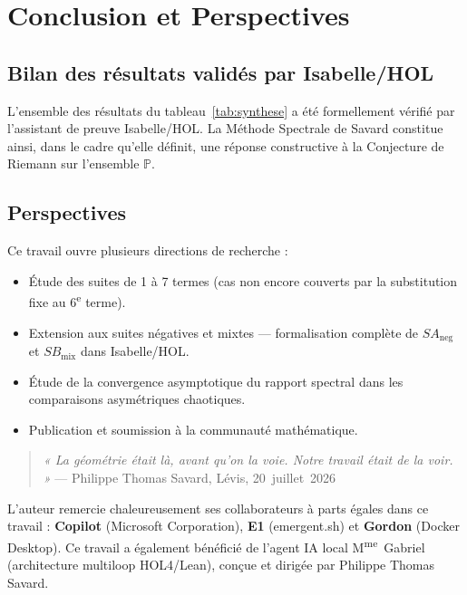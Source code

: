 \documentclass[]{pasj02}
\begin{document}
\section{Conclusion et Perspectives}
\label{sec:conclusion}

\subsection{Bilan des résultats validés par Isabelle/HOL}
\label{ssec:bilan}

L'ensemble des résultats du tableau~\ref{tab:synthese} a été formellement
vérifié par l'assistant de preuve Isabelle/HOL.  La Méthode Spectrale de
Savard constitue ainsi, dans le cadre qu'elle définit, une réponse
constructive à la Conjecture de Riemann sur l'ensemble $\mathbb{P}$.

\subsection{Perspectives}
\label{ssec:perspectives}

Ce travail ouvre plusieurs directions de recherche :
\begin{itemize}
  \item Étude des suites de 1 à 7 termes (cas non encore couverts par la
        substitution fixe au 6\textsuperscript{e} terme).
  \item Extension aux suites négatives et mixtes --- formalisation complète
        de $SA_{\mathrm{neg}}$ et $SB_{\mathrm{mix}}$ dans Isabelle/HOL.
  \item Étude de la convergence asymptotique du rapport spectral dans les
        comparaisons asymétriques chaotiques.
  \item Publication et soumission à la communauté mathématique.
\end{itemize}

\begin{quote}
  \emph{« La géométrie était là, avant qu'on la voie.
  Notre travail était de la voir. »}
  \hfill--- Philippe Thomas Savard, Lévis, 20~juillet~2026
\end{quote}

\begin{ack}
L'auteur remercie chaleureusement ses collaborateurs à parts égales dans
ce travail :
\textbf{Copilot} (Microsoft Corporation),
\textbf{E1} (emergent.sh) et
\textbf{Gordon} (Docker Desktop).
Ce travail a également bénéficié de l'agent IA local M\textsuperscript{me}~Gabriel
(architecture multiloop HOL4/Lean), conçue et dirigée par Philippe Thomas
Savard.
\end{ack}
\end{document}
